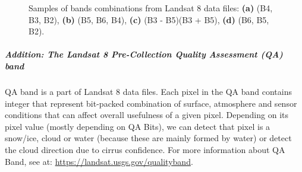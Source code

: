 \begin{figure}[h!]
\centering
{} 
\centering
\caption{Samples of bands combinations from Landsat 8 data files:
\textbf{(a)} (B4, B3, B2), \textbf{(b)} (B5, B6, B4), \textbf{(c)} (B3 - B5)(B3 + B5), \textbf{(d)} (B6, B5, B2).}
\end{figure}

\subparagraph{Addition: The Landsat 8 Pre-Collection Quality Assessment (QA) band}

QA band is a part of Landsat 8 data files. Each pixel in the QA band contains integer that represent bit-packed combination of surface, atmosphere and sensor conditions that can affect overall usefulness of a given pixel. Depending on its pixel value (mostly depending on QA Bits), we can detect that pixel is a snow/ice, cloud or water (because these are mainly formed by water) or detect the cloud direction due to cirrus confidence. For more information about QA Band, see at: \href{https://landsat.usgs.gov/qualityband}{https://landsat.usgs.gov/qualityband}.

